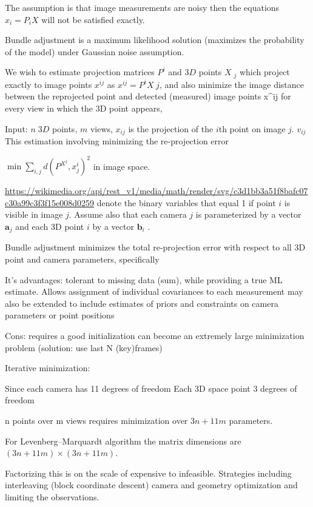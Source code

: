 \begin{enumerate}
The assumption is that image measurements are noisy then the equations $x_i = P_i X$ will not be satisfied exactly. 

Bundle adjustment is a maximum likelihood solution (maximizes the probability of the model) under Gaussian  noise assumption. 

We wish to estimate projection matrices $P^i$ and $3D$ points $X􏰟_j$ which project exactly to image points
$x^{ij}$ as $x^{ij} = P^iX_􏰟j$, and also minimize the image distance between the reprojected point and detected (measured) image points x^{ij} for every view in which the 3D point appears,

Input: $n \; 3D$ points, $m$ views, $x_{ij}$ is the projection of the $i$th point on image $j$. $v_{ij}$
This estimation involving minimizing the re-projection error 

$\min \sum_{i,j} d(P^X^j, x_j^i)^2 $ in image space.

\url{https://wikimedia.org/api/rest_v1/media/math/render/svg/c3d1bb3a51f8bafc07c30a99c3f3f15e008d0259}
 denote the binary variables that equal 1 if point $i$ is visible in image $j$. Assume also that each camera $j$  is parameterized by a vector $\mathbf{a}_{j}$ and each 3D point $i$ by a vector $\mathbf{b}_{i}$ . 

Bundle adjustment minimizes the total re-projection error with respect to all 3D point and camera parameters, specifically

It's advantages: tolerant to missing data (sum), while providing a true ML estimate. 
Allows assignment of individual covariances to each measurement
may also be extended to include estimates of priors and constraints on camera parameters or point positions

Cons:
requires a good initialization 
can become an extremely large minimization problem (solution: use last N (key)frames)

Iterative minimization:

Since each camera has 11 degrees of freedom 
Each 3D space point 3 degrees of freedom

n points over m views requires minimization over $3n + 11m$ parameters. 

For Levenberg–Marquardt algorithm the matrix dimensions are $(3n + 11m)\times (3n + 11m)$. 

Factorizing this is on the scale of expensive to infeasible. Strategies including interleaving (block coordinate descent) camera and geometry optimization and limiting the observations.


\end{enumerate}
